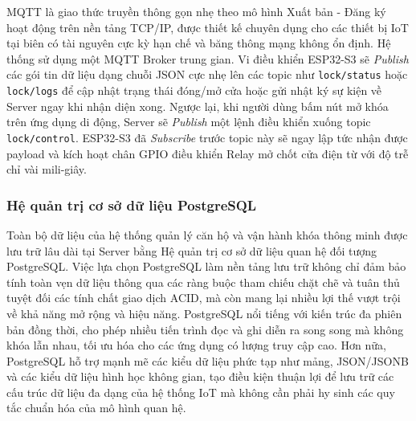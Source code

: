 MQTT là giao thức truyền thông gọn nhẹ theo mô hình Xuất bản - Đăng ký hoạt động trên nền tảng TCP/IP, được thiết kế chuyên dụng cho các thiết bị IoT tại biên có tài nguyên cực kỳ hạn chế và băng thông mạng không ổn định. Hệ thống sử dụng một MQTT Broker trung gian. Vi điều khiển ESP32-S3 sẽ \textit{Publish} các gói tin dữ liệu dạng chuỗi JSON cực nhẹ lên các topic như \texttt{lock/status} hoặc \texttt{lock/logs} để cập nhật trạng thái đóng/mở cửa hoặc gửi nhật ký sự kiện về Server ngay khi nhận diện xong. Ngược lại, khi người dùng bấm nút mở khóa trên ứng dụng di động, Server sẽ \textit{Publish} một lệnh điều khiển xuống topic \texttt{lock/control}. ESP32-S3 đã \textit{Subscribe} trước topic này sẽ ngay lập tức nhận được payload và kích hoạt chân GPIO điều khiển Relay mở chốt cửa điện từ với độ trễ chỉ vài mili-giây.

\subsubsection{Hệ quản trị cơ sở dữ liệu PostgreSQL}
Toàn bộ dữ liệu của hệ thống quản lý căn hộ và vận hành khóa thông minh được lưu trữ lâu dài tại Server bằng Hệ quản trị cơ sở dữ liệu quan hệ đối tượng PostgreSQL. Việc lựa chọn PostgreSQL làm nền tảng lưu trữ không chỉ đảm bảo tính toàn vẹn dữ liệu thông qua các ràng buộc tham chiếu chặt chẽ và tuân thủ tuyệt đối các tính chất giao dịch ACID, mà còn mang lại nhiều lợi thế vượt trội về khả năng mở rộng và hiệu năng. PostgreSQL nổi tiếng với kiến trúc đa phiên bản đồng thời, cho phép nhiều tiến trình đọc và ghi diễn ra song song mà không khóa lẫn nhau, tối ưu hóa cho các ứng dụng có lượng truy cập cao. Hơn nữa, PostgreSQL hỗ trợ mạnh mẽ các kiểu dữ liệu phức tạp như mảng, JSON/JSONB và các kiểu dữ liệu hình học không gian, tạo điều kiện thuận lợi để lưu trữ các cấu trúc dữ liệu đa dạng của hệ thống IoT mà không cần phải hy sinh các quy tắc chuẩn hóa của mô hình quan hệ.